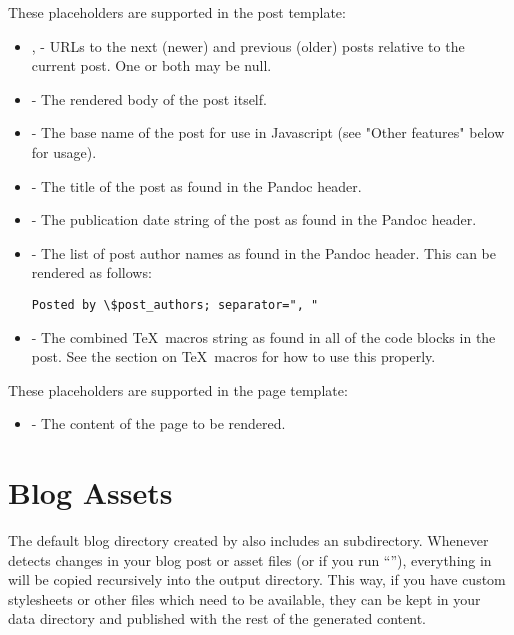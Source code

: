 \documentclass[11pt, letterpaper, oneside, titlepage]{book}
\begin{document}
These placeholders are supported in the post template:

\begin{itemize}
\item{,  - URLs to the
  next (newer) and previous (older) posts relative to the current
  post.  One or both may be null.}
\item{ - The rendered body of the post itself.}
\item{ - The base name of the post for use in
  Javascript (see "Other features" below for usage).}
\item{ - The title of the post as found in the Pandoc
  header.}
\item{ - The publication date string of the post as
  found in the Pandoc header.}
\item{ - The list of post author names as found in
  the Pandoc header.  This can be rendered as follows:
\begin{verbatim}
Posted by \$post_authors; separator=", "
\end{verbatim}
}
\item{ - The combined \TeX\ macros string as
  found in all of the  code blocks in the post.  See
  the section on \TeX\ macros for how to use this properly.}
\end{itemize}

These placeholders are supported in the page template:

\begin{itemize}
\item{ - The content of the page to be rendered.}
\end{itemize}

\section{Blog Assets}

The default blog directory created by  also includes an
 subdirectory.  Whenever  detects changes in your
blog post or asset files (or if you run ``''), everything in
 will be copied recursively into the output directory.
This way, if you have custom stylesheets or other files which need to
be available, they can be kept in your data directory and published
with the rest of the generated content.
\end{document}
